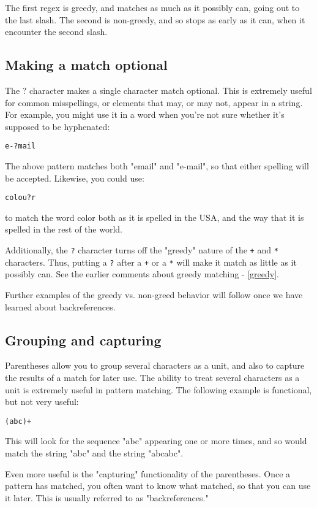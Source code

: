 The first regex is greedy, and matches as much as it possibly can, going
out to the last slash. The second is non-greedy, and so stops as early as it can, when it encounter
the second slash.

\subsection{Making a match optional}

The ? character makes a single character match optional. This is extremely useful for 
common misspellings, or elements that may, or may not, appear in a string. For example, you 
might use it in a word when you're not sure whether it's supposed to be hyphenated:

\verb=e-?mail=

The above pattern matches both "email" and "e-mail", so that either
spelling will be accepted. Likewise, you could use:

\verb=colou?r=

to match the word color both as it is spelled in the USA, and the way
that it is spelled in the rest of the world.

Additionally, the \verb=?= character turns off the "greedy" nature of the \verb=+= 
and \verb=*= characters. Thus, putting a \verb=?= after a \verb=+= or a 
\verb=*= will make it match as little as it possibly can. See the earlier 
comments about greedy matching - \ref{greedy}.

Further examples of the greedy vs. non-greed behavior will follow once we have learned 
about backreferences.

\subsection{Grouping and capturing}
\index{( )}

Parentheses allow you to group several characters as a unit, and also to capture the results of 
a match for later use. The ability to treat several characters as a unit is extremely useful in 
pattern matching. The following example is functional, but not very useful:

\verb=(abc)+=

This will look for the sequence "abc" appearing one or more times, and so would match 
the string "abc" and the string "abcabc".

\label{backreferences}
Even more useful is the "capturing" functionality of the parentheses. Once a pattern has 
matched, you often want to know what matched, so that you can use it later. This is usually 
referred to as "backreferences."

